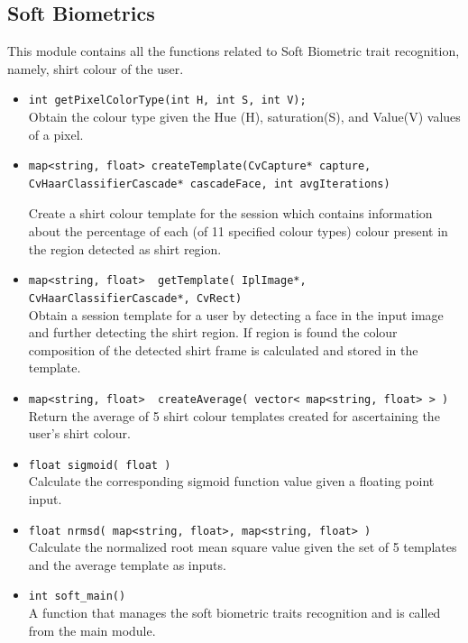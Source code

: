 \documentclass[12pt]{report}			%
\begin{document}
\subsection { Soft Biometrics }
This module contains all the functions related to Soft Biometric trait recognition, namely, shirt colour of the user.

\begin{itemize}
\item
\verb+int getPixelColorType(int H, int S, int V);+\\
Obtain the colour type given the Hue (H), saturation(S), and Value(V) values of a pixel.

\item
\begin{verbatim}
map<string, float> createTemplate(CvCapture* capture,
CvHaarClassifierCascade* cascadeFace, int avgIterations)
\end{verbatim}
Create a shirt colour template for the session which contains information about the percentage of each (of 11 specified colour types) colour present in the region detected as shirt region.
\item
\verb+map<string, float>  getTemplate( IplImage*, CvHaarClassifierCascade*, CvRect)+\\
Obtain a session template for a user by detecting a face in the input image and further detecting the shirt region. If region is found the colour composition of the detected shirt frame is calculated and stored in the template.

\item
\verb+map<string, float>  createAverage( vector< map<string, float> > )+\\
Return the average of 5 shirt colour templates created for ascertaining the user's shirt colour. 

\item
\verb+float sigmoid( float )+\\
Calculate the corresponding sigmoid function value given a floating point input. 

\item
\verb+float nrmsd( map<string, float>, map<string, float> )+\\
Calculate the normalized root mean square value given the set of 5 templates and the average template as inputs. 

\item
\verb+int soft_main()+\\
A function that manages the soft biometric traits recognition and is called from the main module.
\end{itemize}
\end{document}
